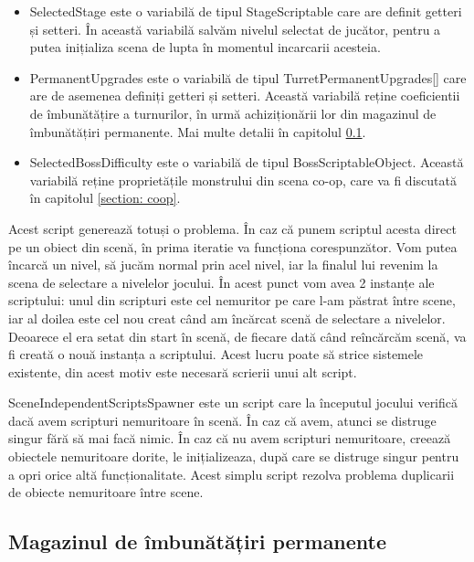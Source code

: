 \documentclass[12pt, a4paper]{article}
\begin{document}
	\begin{itemize}
		\item SelectedStage este o variabilă de tipul StageScriptable care are definit getteri și setteri. În această variabilă salvăm nivelul selectat de jucător, pentru a putea inițializa scena de lupta în momentul incarcarii acesteia.
		\item PermanentUpgrades este o variabilă de tipul TurretPermanentUpgrades[] care are de asemenea definiți getteri și setteri. Această variabilă reține coeficientii de îmbunătățire a turnurilor, în urmă achiziționării lor din magazinul de îmbunătățiri permanente. Mai multe detalii în capitolul \ref{section: permanentUpgrade}.
		\item SelectedBossDifficulty este o variabilă de tipul BossScriptableObject. Această variabilă reține proprietățile monstrului din scena co-op, care va fi discutată în capitolul \ref{section: coop}.
	\end{itemize}
	
	Acest script generează totuși o problema. În caz că punem scriptul acesta direct pe un obiect din scenă, în prima iteratie va funcționa corespunzător. Vom putea încarcă un nivel, să jucăm normal prin acel nivel, iar la finalul lui revenim la scena de selectare a nivelelor jocului. În acest punct vom avea 2 instanțe ale scriptului: unul din scripturi este cel nemuritor pe care l-am păstrat între scene, iar al doilea este cel nou creat când am încărcat scenă de selectare a nivelelor. Deoarece el era setat din start în scenă, de fiecare dată când reîncărcăm scenă, va fi creată o nouă instanța a scriptului. Acest lucru poate să strice sistemele existente, din acest motiv este necesară scrierii unui alt script.
	\newline
	
	SceneIndependentScriptsSpawner este un script care la începutul jocului verifică dacă avem scripturi nemuritoare în scenă. În caz că avem, atunci se distruge singur fără să mai facă nimic. În caz că nu avem scripturi nemuritoare, creează obiectele nemuritoare dorite, le inițializeaza, după care se distruge singur pentru a opri orice altă funcționalitate. Acest simplu script rezolva problema duplicarii de obiecte nemuritoare între scene.
	
	
	
	
	
	\subsection{Magazinul de îmbunătățiri permanente}
	\label{section: permanentUpgrade}
	
\end{document}

